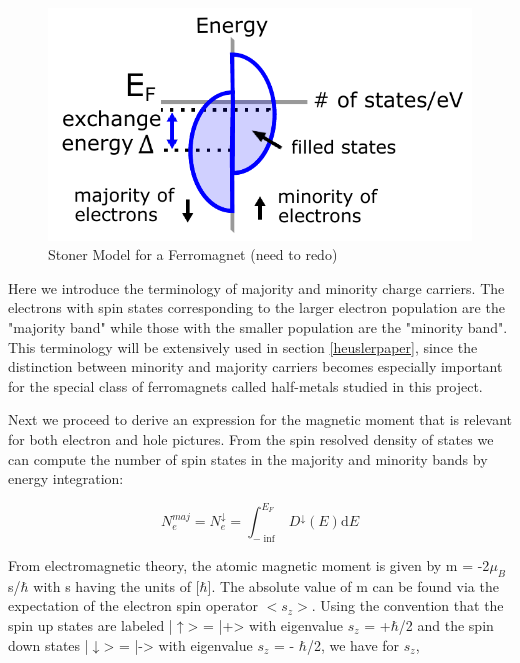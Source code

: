 \begin{figure}
	\begin{center}
		\includegraphics[width=150mm]{figs/StonerModel}
	\end{center}
	\caption{Stoner Model for a Ferromagnet (need to redo)}
	\label{StonerModel}
\end{figure}

Here we introduce the terminology of majority and minority charge carriers. The electrons with spin states corresponding to the larger electron population are the "majority band" while those with the smaller population are the "minority band". This terminology will be extensively used in section \ref{heuslerpaper}, since the distinction between minority and majority carriers becomes especially important for the special class of ferromagnets called half-metals studied in this project.

Next we proceed to derive an expression for the magnetic moment that is relevant for both electron and hole pictures. From the spin resolved density of states we can compute the number of spin states in the majority and minority bands by energy integration:

\begin{equation}
N_{e}^{maj}=N_e^\downarrow = \int_{-\inf}^{E_F}D^\downarrow(E)\text{d}E
\end{equation}

From electromagnetic theory, the atomic magnetic moment is given by m = -2$\mu_B$s/$\hbar$ with s having the units of [$\hbar$]. The absolute value of m can be found via the expectation of the electron spin operator $<s_z>$. Using the convention that the spin up states are labeled |$\uparrow$> = |+> with eigenvalue $s_z$ = +$\hbar$/2 and the spin down states |$\downarrow$> = |-> with eigenvalue $s_z$ = - $\hbar$/2, we have for $s_z$,

